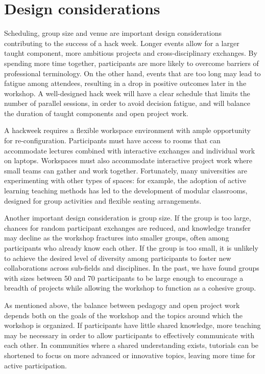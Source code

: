 \section*{Design considerations}

Scheduling, group size and venue are important design considerations contributing to the success of a hack week.
Longer events allow for a larger taught component, more ambitious projects and cross-disciplinary exchanges.
By spending more time together, participants are more likely to overcome barriers of professional terminology.
On the other hand, events that are too long may lead to fatigue among attendees, resulting in a drop in positive outcomes later in the workshop.
A well-designed hack week will have a clear schedule that limits the number of parallel sessions, in order to avoid decision fatigue, and will balance the duration of taught components and open project work.

A hackweek requires a flexible workspace environment with ample opportunity for re-configuration.
Participants must have access to rooms that can accommodate lectures combined with interactive exchanges and individual work on laptops.
Workspaces must also accommodate interactive project work where small teams can gather and work together.
Fortunately, many universities are experimenting with other types of spaces: for example, the adoption of active learning teaching methods \cite{prince2004} has led to the development of modular classrooms, designed for group activities and flexible seating arrangements.

Another important design consideration is group size.
If the group is too large, chances for random participant exchanges are reduced, and knowledge transfer may decline as the workshop fractures into smaller groups, often among participants who already know each other.
If the group is too small, it is unlikely to achieve the desired level of diversity among participants to foster new collaborations across sub-fields and disciplines.
In the past, we have found groups with sizes between 50 and 70 participants to be large enough to encourage a breadth of projects while allowing the workshop to function as a cohesive group.

As mentioned above, the balance between pedagogy and open project work depends both on the goals of the workshop and the topics around which the workshop is organized.
If participants have little shared knowledge, more teaching may be necessary in order to allow participants to effectively communicate with each other.
In communities where a shared understanding exists, tutorials can be shortened to focus on more advanced or innovative topics, leaving more time for active participation.

